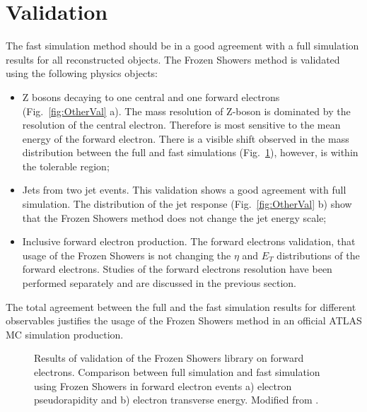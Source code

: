 \section{Validation}\label{sec:FSValidation}

The fast simulation method  should be in a  good agreement with a full simulation results for all  reconstructed objects. The Frozen Showers method is validated using the following physics objects:
\begin{itemize}
\item Z bosons decaying to one central and one forward electrons (Fig.~\ref{fig:OtherVal} a). The mass resolution of Z-boson is dominated by the resolution of the central electron. Therefore is most sensitive to the mean energy of the forward electron. There is a visible shift observed in the mass distribution between the full and fast simulations (Fig.~\ref{fig:OtherValFwd}), however, is within the tolerable region;
\item Jets from two jet events. This validation shows a good agreement with full simulation. The distribution of the jet response (Fig.~\ref{fig:OtherVal} b) show that the Frozen Showers method does not change the jet energy scale;
\item Inclusive forward electron production. The forward electrons validation, that usage of the Frozen Showers is not changing the $\eta$ and $E_{T}$ distributions of the forward electrons.  Studies of the forward electrons resolution have been performed separately and are discussed in the previous section.
\end{itemize}
The total agreement between the full and the fast simulation results for different observables justifies the usage of the  Frozen Showers method in an official ATLAS MC simulation production.

\begin{figure}[!tbp]
\begin{minipage}[h]{0.49\linewidth}
\end{minipage}
\hfill
\begin{minipage}[h]{0.49\linewidth}
\end{minipage}
\caption{Results of validation of the Frozen Showers library on forward electrons. Comparison between full simulation and fast simulation using Frozen Showers in forward electron events  a) electron pseudorapidity and b) electron transverse energy. Modified from \cite{ElecForwardVal}. }
\label{fig:OtherValFwd}
\end{figure}


